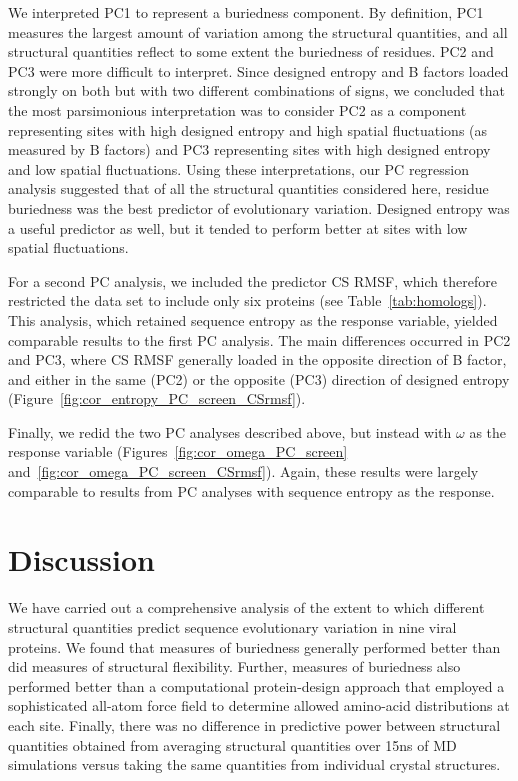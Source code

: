 \documentclass[smallextended]{svjour3}
\begin{document}
{\color{red}We interpreted PC1 to represent a buriedness component. By definition, PC1 measures the largest amount of variation among the structural quantities, and all structural quantities reflect to some extent the buriedness of residues. PC2 and PC3 were more difficult to interpret. Since designed entropy and B factors loaded strongly on both but with two different combinations of signs, we concluded that the most parsimonious interpretation was to consider PC2 as a component representing sites with high designed entropy and high spatial fluctuations (as measured by B factors) and PC3 representing sites with high designed entropy and low spatial fluctuations. Using these interpretations, our PC regression analysis suggested that of all the structural quantities considered here, residue buriedness was the best predictor of evolutionary variation. Designed entropy was a useful predictor as well, but it tended to perform better at sites with low spatial fluctuations.}

For a second PC analysis, we included the predictor CS RMSF, which therefore restricted the data set to include only six proteins (see Table~\ref{tab:homologs}). This analysis, which retained sequence entropy as the response variable, yielded comparable results to the first PC analysis. The main differences occurred in PC2 and PC3, where CS RMSF generally loaded in the opposite direction of B factor, and either in the same (PC2) or the opposite (PC3) direction of designed entropy (Figure~\ref{fig:cor_entropy_PC_screen_CSrmsf}). 

Finally, we redid the two PC analyses described above, but instead with $\omega$ as the response variable (Figures~\ref{fig:cor_omega_PC_screen} and~\ref{fig:cor_omega_PC_screen_CSrmsf}). Again, these results were largely comparable to results from PC analyses with sequence entropy as the response.

\section*{Discussion}

{\color{red}We have carried out a comprehensive analysis of the extent to which different structural quantities predict sequence evolutionary variation in nine viral proteins. We  found that measures of buriedness generally performed better than did measures of structural flexibility. Further, measures of buriedness also performed better than a computational protein-design approach that employed a sophisticated all-atom force field to determine allowed amino-acid distributions at each site. Finally, there was no difference in predictive power between structural quantities obtained from averaging structural quantities over 15ns of MD simulations versus taking the same quantities from individual crystal structures. }
\end{document}
